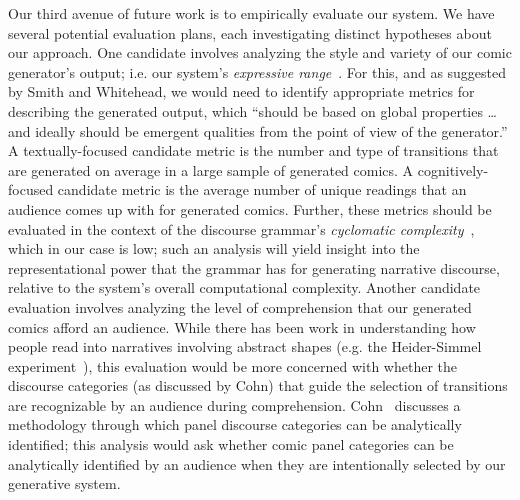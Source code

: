 Our third avenue of future work is to empirically evaluate our system.  We
have several potential evaluation plans, each investigating distinct
hypotheses about our approach.
%
One candidate involves analyzing the style and variety of our
comic generator's output; i.e. our system's 
\emph{expressive range}~\cite{smith2010analyzing}. For this, and as
suggested by Smith and Whitehead, we would need to identify
appropriate metrics for describing the generated output, which ``should be
based on global properties \ldots and ideally should be emergent qualities
from the point of view of the generator.'' A textually-focused candidate 
metric is the number and type of transitions that are generated on average
in a large sample of generated comics. A cognitively-focused candidate
metric is the average number of unique readings that an audience comes up
with for generated comics. Further, these metrics should be evaluated in
the context of the discourse grammar's \emph{cyclomatic
complexity}~\cite{mccabe1976complexity}, which in our case is low; such an
analysis will yield insight into the representational power that the
grammar has for generating narrative discourse, relative to the system's
overall computational complexity.
%
Another candidate evaluation involves analyzing the level of comprehension
that our generated comics afford an audience. While there has been work in
understanding how people read into narratives involving abstract
shapes (e.g. the Heider-Simmel experiment~\cite{heider1944experimental}),
this evaluation would be more concerned with whether the discourse
categories (as discussed by Cohn) that guide the selection of transitions
are recognizable by an audience during comprehension.
Cohn~\cite{cohn2015narrative} discusses a methodology through which panel
discourse categories can be analytically identified; this analysis would
ask whether comic panel categories can be analytically identified by an
audience when they are intentionally selected by our generative system.




